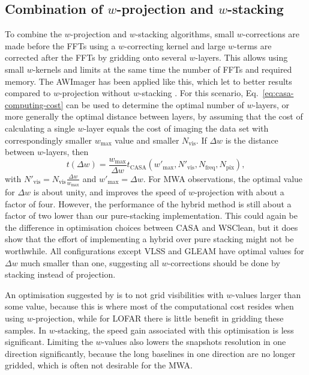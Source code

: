\documentclass[useAMS,usenatbib]{mn2e}
\begin{document}
\subsection{Combination of $w$-projection and $w$-stacking}
To combine the $w$-projection and $w$-stacking algorithms, small $w$-corrections are made before the FFTs using a $w$-correcting kernel and large $w$-terms are corrected after the FFTs by gridding onto several $w$-layers. This allows using small $w$-kernels and limits at the same time the number of FFTs and required memory. The AWImager has been applied like this, which let to better results compared to $w$-projection without $w$-stacking \citep{awimager-2013}. For this scenario, Eq.~\eqref{eq:casa-computing-cost} can be used to determine the optimal number of $w$-layers, or more generally the optimal distance between layers, by assuming that the cost of calculating a single $w$-layer equals the cost of imaging the data set with correspondingly smaller $w_{\max}$ value and smaller $N_\textrm{vis}$. If $\Delta w$ is the distance between $w$-layers, then 
\begin{equation}
t(\Delta w) = \frac{w_{\max}}{\Delta w} t_\textrm{CASA}(w'_{\max},N'_\textrm{vis},N_\textrm{freq},N_\textrm{pix}),
\end{equation}
with $N'_\textrm{vis} = N_\textrm{vis}\frac{\Delta w}{w_{\max}}$ and $w'_{\max} = \Delta w$. For MWA observations, the optimal value for $\Delta w$ is about unity, and improves the speed of $w$-projection with about a factor of four. However, the performance of the hybrid method is still about a factor of two lower than our pure-stacking implementation. This could again be the difference in optimisation choices between CASA and WSClean, but it does show that the effort of implementing a hybrid over pure stacking might not be worthwhile. All configurations except VLSS and GLEAM have optimal values for $\Delta w$ much smaller than one, suggesting all $w$-corrections should be done by stacking instead of projection.

An optimisation suggested by \citet{awimager-2013} is to not grid visibilities with $w$-values larger than some value, because this is where most of the computational cost resides when using $w$-projection, while for LOFAR there is little benefit in gridding these samples. In $w$-stacking, the speed gain associated with this optimisation is less significant. Limiting the $w$-values also lowers the snapshots resolution in one direction significantly, because the long baselines in one direction are no longer gridded, which is often not desirable for the MWA.
\end{document}
